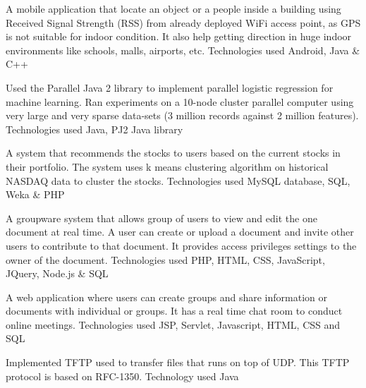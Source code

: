 \documentclass[]{main}
\begin{document}
\begin{minipage}[t]{0.73\textwidth}
 
A mobile application that locate an object or a people inside a building using Received Signal Strength (RSS) from already deployed WiFi access point, as GPS is not suitable for indoor condition.
It also help getting direction in huge indoor environments like schools, malls, airports, etc.
Technologies used Android, Java \& C++
\sectionsep

 
Used the Parallel Java 2 library to implement parallel logistic regression for machine learning.
Ran experiments on a 10-node cluster parallel computer using very large and very sparse data-sets (3 million records against 2 million features).
Technologies used Java, PJ2 Java library
\sectionsep

 
A system that recommends the stocks to users based on the current stocks in their portfolio. 
The system uses k means clustering algorithm on historical NASDAQ data to cluster the stocks. 
Technologies used MySQL database, SQL, Weka \& PHP
\sectionsep

 
A groupware system that allows group of users to view and edit the one document at real time. 
A user can create or upload a document and invite other users to contribute to that document. 
It provides access privileges settings to the owner of the document.
Technologies used PHP, HTML, CSS, JavaScript, JQuery, Node.js \& SQL
\sectionsep

 
A web application where users can create groups and share information or documents with individual or groups.
It has a real time chat room to conduct online meetings.
Technologies used JSP, Servlet, Javascript, HTML, CSS and SQL
\sectionsep

 
Implemented TFTP used to transfer files that runs on top of UDP. This TFTP protocol is based on RFC-1350.
Technology used Java
\sectionsep

\end{minipage}
\end{document}
